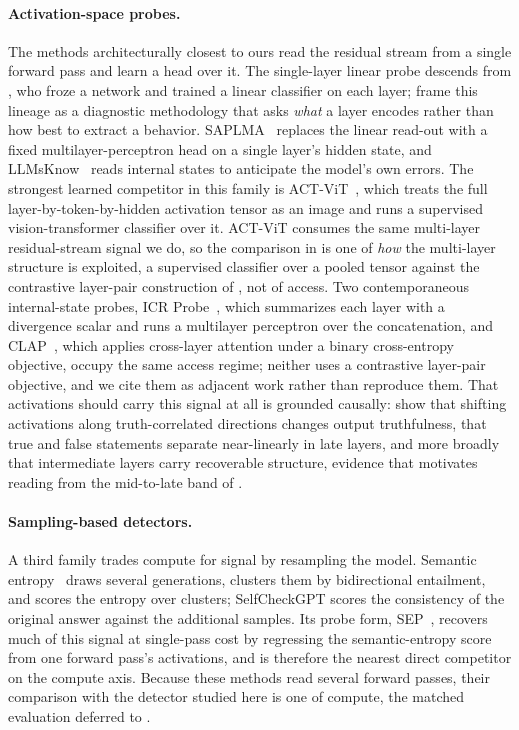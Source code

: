 \paragraph{Activation-space probes.}
The methods architecturally closest to ours read the residual stream from a
single forward pass and learn a head over it. The single-layer linear probe
descends from \citet{alain2017understanding}, who froze a network and trained a
linear classifier on each layer; \citet{belinkov2019analysis} frame this lineage
as a diagnostic methodology that asks \emph{what} a layer encodes rather than how
best to extract a behavior. SAPLMA~\citep{azaria2023internal} replaces the linear
read-out with a fixed multilayer-perceptron head on a single layer's hidden state,
and LLMsKnow~\citep{orgad2024llmsknow} reads internal states to anticipate the
model's own errors. The strongest learned competitor in this family is
ACT-ViT~\citep{barshalom2025actvit}, which treats the full layer-by-token-by-hidden
activation tensor as an image and runs a supervised vision-transformer classifier
over it. ACT-ViT consumes the same multi-layer residual-stream signal we do, so
the comparison in  is one of \emph{how} the multi-layer
structure is exploited, a supervised classifier over a pooled tensor against the
contrastive layer-pair construction of , not of access. Two
contemporaneous internal-state probes, ICR Probe~\citep{zhang2025icr}, which
summarizes each layer with a divergence scalar and runs a multilayer perceptron
over the concatenation, and CLAP~\citep{suresh2025clap}, which applies cross-layer
attention under a binary cross-entropy objective, occupy the same access regime;
neither uses a contrastive layer-pair objective, and we cite them as adjacent work
rather than reproduce them. That activations should carry this signal at all is
grounded causally: \citet{li2023iti} show that shifting activations along
truth-correlated directions changes output truthfulness, \citet{marks2024geometry}
that true and false statements separate near-linearly in late layers, and
\citet{belinkov2019analysis} more broadly that intermediate layers carry
recoverable structure, evidence that motivates reading from the mid-to-late band
of .

\paragraph{Sampling-based detectors.}
A third family trades compute for signal by resampling the model. Semantic
entropy~\citep{farquhar2024detecting} draws several generations, clusters them by
bidirectional entailment, and scores the entropy over clusters; SelfCheckGPT
\citep{manakul2023selfcheckgpt} scores the consistency of the original answer
against the additional samples. Its probe form, SEP~\citep{kossen2024semantic},
recovers much of this signal at single-pass cost by regressing the
semantic-entropy score from one forward pass's activations, and is therefore the
nearest direct competitor on the compute axis. Because these methods read several
forward passes, their comparison with the detector studied here is one of compute,
the matched evaluation deferred to .


